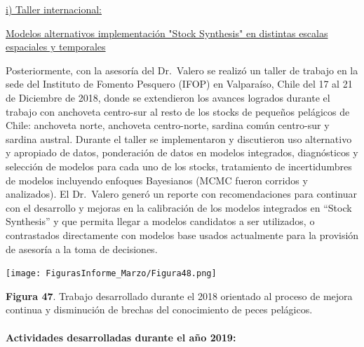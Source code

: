 \documentclass[
  spanish,
]{article}
\begin{document}
\vspace{0.3cm}

\underline{i) Taller internacional:}

\underline{Modelos alternativos implementación "Stock Synthesis" en distintas escalas espaciales y temporales}

Posteriormente, con la asesoría del Dr.~Valero se realizó un taller de
trabajo en la sede del Instituto de Fomento Pesquero (IFOP) en
Valparaíso, Chile del 17 al 21 de Diciembre de 2018, donde se
extendieron los avances logrados durante el trabajo con anchoveta
centro-sur al resto de los stocks de pequeños pelágicos de Chile:
anchoveta norte, anchoveta centro-norte, sardina común centro-sur y
sardina austral. Durante el taller se implementaron y discutieron uso
alternativo y apropiado de datos, ponderación de datos en modelos
integrados, diagnósticos y selección de modelos para cada uno de los
stocks, tratamiento de incertidumbres de modelos incluyendo enfoques
Bayesianos (MCMC fueron corridos y analizados). El Dr.~Valero generó un
reporte con recomendaciones para continuar con el desarrollo y mejoras
en la calibración de los modelos integrados en ``Stock Synthesis'' y que
permita llegar a modelos candidatos a ser utilizados, o contrastados
directamente con modelos base usados actualmente para la provisión de
asesoría a la toma de decisiones.

\begin{center}
\texttt{[image: FigurasInforme\_Marzo/Figura48.png]}
\end{center}

\small

\textbf{Figura 47}. Trabajo desarrollado durante el 2018 orientado al
proceso de mejora continua y disminución de brechas del conocimiento de
peces pelágicos. \vspace{0.5cm}

\normalsize

\hypertarget{actividades-desarrolladas-durante-el-auxf1o-2019}{%
\paragraph{Actividades desarrolladas durante el año
2019:}\label{actividades-desarrolladas-durante-el-auxf1o-2019}}
\end{document}
